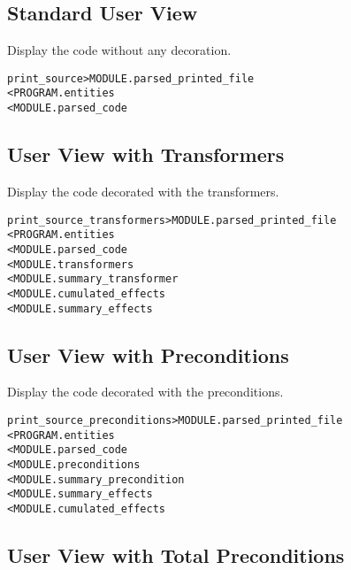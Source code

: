 \documentclass[a4paper]{report}
\newenvironment{PipsMake}{\begin{alltt}}{\end{alltt}}
\newenvironment{PipsPass}[1]{\label{pass:#1}}{}
\begin{document}
\subsection{Standard User View}

\begin{PipsPass}{print_source}
Display the code without any decoration.
\end{PipsPass}

\begin{PipsMake}
print_source         > MODULE.parsed_printed_file
        < PROGRAM.entities
        < MODULE.parsed_code
\end{PipsMake}

\subsection{User View with Transformers}

\begin{PipsPass}{print_source_transformers}
Display the code decorated with the transformers.
\end{PipsPass}

\begin{PipsMake}
print_source_transformers         > MODULE.parsed_printed_file
        < PROGRAM.entities
        < MODULE.parsed_code
        < MODULE.transformers
        < MODULE.summary_transformer
        < MODULE.cumulated_effects
        < MODULE.summary_effects
\end{PipsMake}

\subsection{User View with Preconditions}

\begin{PipsPass}{print_source_preconditions}
Display the code decorated with the preconditions.
\end{PipsPass}

\begin{PipsMake}
print_source_preconditions        > MODULE.parsed_printed_file
        < PROGRAM.entities
        < MODULE.parsed_code
        < MODULE.preconditions
        < MODULE.summary_precondition
        < MODULE.summary_effects
        < MODULE.cumulated_effects
\end{PipsMake}

\subsection{User View with Total Preconditions}
\end{document}
